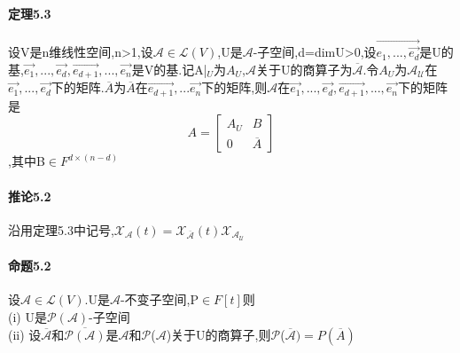 \documentclass{ctexart}
\begin{document}
\paragraph{定理5.3}
设V是n维线性空间,n>1,设$\mathcal{A}\in \mathcal{L}(V)$,U是$\mathcal{A}$-子空间,d=dimU>0,设$\vec{e_{1},...,\vec{e_{d}}}$是U的基,$\vec{e_{1}},...,\vec{e_{d}},\vec{e_{d+1}},...,\vec{e_{n}}$是V的基.记A|$_{U}$为$A_{U}$,$\mathcal{A}$关于U的商算子为$\overline{\mathcal{A}}$.令$A_{U}$为$\mathcal{A_{U}}$在$\vec{e_{1}},...,\vec{e_{d}}$下的矩阵.$\overline{A}$为$\overline{A}$在$\vec{e_{d+1}},...\vec{e_{n}}$下的矩阵,则$\mathcal{A}$在$\vec{e_{1}},...,\vec{e_{d}},\vec{e_{d+1}},...,\vec{e_{n}}$下的矩阵是\\
\begin{equation}
A=
\left[ \begin{array}{cc}
A_{U} & B\\
0 & \overline{A}
\end{array} 
\right]
\end{equation},其中B$\in F^{d\times(n-d)}$
\paragraph{推论5.2}
沿用定理5.3中记号,$\mathcal{X_{\mathcal{A}}}(t)=\mathcal{X_{\overline{A}}}(t)\mathcal{X_{\mathcal{A_{U}}}}$
\paragraph{命题5.2}
设$\mathcal{A}\in\mathcal{L}(V)$.U是$\mathcal{A}$-不变子空间,P$\in F[t]$则\\
(i) U是$\mathcal{P}(\mathcal{A})$-子空间\\
(ii) 设$\overline{\mathcal{A}}$和$\mathcal{\overline{P(\mathcal{A})}}$是$\mathcal{A}$和$\mathcal{P}$($\mathcal{A}$)关于U的商算子,则$\mathcal{P}$($\overline{\mathcal{A}})=P(\overline{A})$
\end{document}
